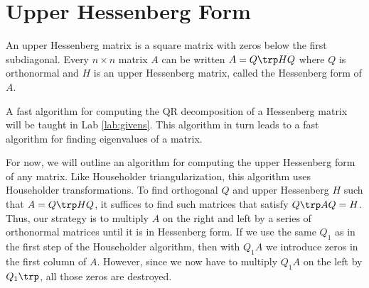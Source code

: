 \begin{comment}
In fact, the large errors in \li{Q1} and \li{R1} were not because the algorithm was bad, it was because $A$ was poorly conditioned.
The condition number for randomly generated upper triangular matrices is generally very high, and this was the case here.
This has, in turn, made the condition number of $A$ extremely large.

Try the following to compute the condition number of $A$.
In this case the condition number of $A$ and $R$ are computed to be different, though, in theory, they should be exactly the same.

\begin{lstlisting}
>>> from numpy.linalg import cond
>>> cond(A)
4.1426075832870472e+18
>>> cond(R)
3.1767577244363792e+19
\end{lstlisting}

Householder QR factorization is more numerically stable than Gram-Schmidt or even Modified Gram-Schmidt (MGS).
However, MGS is still useful for some types of iterative methods because it finds the orthonormal basis one vector at a time instead of all at once (for an example see Lab \ref{lab:EigSolve}).
\end{comment}

\section*{Upper Hessenberg Form} %

An upper Hessenberg matrix is a square matrix with zeros below the first subdiagonal.
Every  $n \times n$ matrix $A$ can be written $A = Q\trp HQ$ where $Q$ is orthonormal and $H$ is an upper Hessenberg matrix, called the Hessenberg form of $A$.

A fast algorithm for computing the QR decomposition of a Hessenberg matrix will be taught in Lab \ref{lab:givens}. This algorithm in turn leads to a fast algorithm for finding eigenvalues of a matrix.

For now, we will outline an algorithm for computing the upper Hessenberg form of any matrix.
Like Householder triangularization, this algorithm uses Householder transformations.
To find orthogonal $Q$ and upper Hessenberg $H$ such that $A = Q\trp HQ$, it suffices to find such matrices that satisfy $Q\trp AQ=H$.
Thus, our strategy is to multiply $A$ on the right and left by a series of orthonormal matrices until it is in Hessenberg form.
If we use the same $Q_1$ as in the first step of the Householder algorithm, then with $Q_1 A$ we introduce zeros in the first column of $A$.
However, since we now have to multiply $Q_1 A$ on the left by $Q_1\trp$, all those zeros are destroyed.

